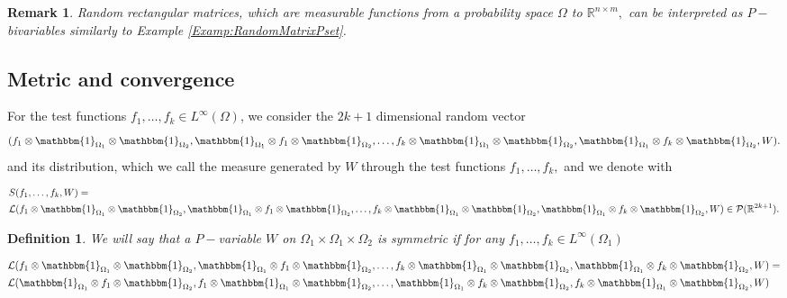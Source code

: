 \documentclass[11pt]{article}
\newtheorem{definition}[theorem]{Definition}
\newtheorem{remark}[theorem]{Remark}
\def\R{\mathbb{R}}
\begin{document}
\begin{remark}
Random rectangular matrices, which are measurable functions from a probability space $\Omega$ to $\R^{n\times m},$ can be interpreted as $P-$bivariables similarly to Example \ref{Examp:RandomMatrixPset}. 
\end{remark}

\subsection{Metric and convergence}

For the test functions $f_1,\ldots, f_{k}\in L^{\infty}(\Omega)$, we consider the $2k+1$ dimensional random vector
$$
(f_1 \otimes\mathbbm{1}_{\Omega_1} \otimes \mathbbm{1}_{\Omega_2},\mathbbm{1}_{\Omega_1}\otimes f_1 \otimes\mathbbm{1}_{\Omega_2},\ldots, f_k \otimes\mathbbm{1}_{\Omega_1} \otimes \mathbbm{1}_{\Omega_2},\mathbbm{1}_{\Omega_1}\otimes f_k \otimes\mathbbm{1}_{\Omega_2},W).
$$
and its distribution, which we call the measure generated by $W$ through the test functions $f_1,\ldots,f_k,$ and we denote with 


\begin{equation}\label{DefSf1f2fk}
    \begin{aligned}
        &S(f_1,\ldots,f_k,W)=\\
        &\mathcal{L}(f_1 \otimes\mathbbm{1}_{\Omega_1} \otimes \mathbbm{1}_{\Omega_2},\mathbbm{1}_{\Omega_1}\otimes f_1 \otimes\mathbbm{1}_{\Omega_2},\ldots, f_k \otimes\mathbbm{1}_{\Omega_1} \otimes \mathbbm{1}_{\Omega_2},\mathbbm{1}_{\Omega_1}\otimes f_k \otimes\mathbbm{1}_{\Omega_2},W)\in \mathcal{P}(\R^{2k+1}).
    \end{aligned}
\end{equation}

\begin{definition}\label{DefSymPset}
    We will say that a $P-$variable $W$ on $\Omega_1\times \Omega_1 \times \Omega_2$ is \emph{symmetric} if for any $f_1,\ldots, f_k \in L^{\infty}(\Omega_1)$

$$
\begin{aligned}&\mathcal{L}(f_1 \otimes\mathbbm{1}_{\Omega_1} \otimes \mathbbm{1}_{\Omega_2},\mathbbm{1}_{\Omega_1}\otimes f_1 \otimes\mathbbm{1}_{\Omega_2},\ldots, f_k \otimes\mathbbm{1}_{\Omega_1} \otimes \mathbbm{1}_{\Omega_2},\mathbbm{1}_{\Omega_1}\otimes f_k \otimes\mathbbm{1}_{\Omega_2},W)=\\
&\mathcal{L}(\mathbbm{1}_{\Omega_1}\otimes f_1 \otimes\mathbbm{1}_{\Omega_2},f_1 \otimes\mathbbm{1}_{\Omega_1} \otimes \mathbbm{1}_{\Omega_2},\ldots, \mathbbm{1}_{\Omega_1}\otimes f_k \otimes\mathbbm{1}_{\Omega_2},f_k \otimes\mathbbm{1}_{\Omega_1} \otimes \mathbbm{1}_{\Omega_2},W)
\end{aligned}$$
\end{definition}
\end{document}
